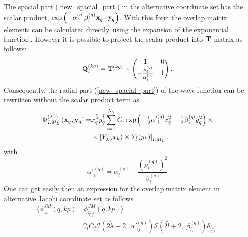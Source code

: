 \documentclass[
12pt, %
oneside, %
english, %
doublespacing, %
doublespacing, %
toctotoc, %
parskip, %
headsepline, %
]{MastersDoctoralThesis} %
\begin{document}
The spacial part (\ref{new_spacial_part}) in the alternative coordinate set has the scalar product, $\exp \left(- \alpha_i^{(q)} \beta_i^{(q)}  {\bf x}_q \cdot {\bf y}_q  \right)$. With this form the overlap matrix elements can be calculated directly, using the expansion of the exponential function \cite{suzuki1998stochastic}. However it is possible  to project the scalar product into ${\bf T}$ matrix \cite{kukulin1990dynamic} as follows:
 \begin{equation}
{\bf Q}_i^{(kq)}= {\bf T}^{(kq)} \times
\begin{pmatrix}
1 &  0 \\ 
-\tfrac{\rho^{(q)}_{i}}{\alpha^{(q)}_i} & 1
\end{pmatrix} .
\label{q_rotation_matrix}
\end{equation}
Consequently, the radial part (\ref{new_spacial_part}) of the wave function can be rewritten without the scalar product term as
\begin{align}
 \Phi_{LM_L}^{(\tilde{\lambda},\tilde{l}) } \left(  {\bf x}_q, {\bf y}_q \right)  =  &
x^{\tilde{\lambda}}_q y^{\tilde{l}}_q 
\sum_{i=1}^{N_\gamma} C_i 
\exp\left( - \tfrac{1}{2} 
{\alpha'}^{(q)}_{i}
 x^2_q -\tfrac{1}{2}  \beta_i^{(q)} y^2_q \right)
\times \nonumber \\
& \times \left[ 
Y_{\tilde{\lambda}} \left(\hat{x}_k \right) \times Y_{\tilde{l}} \left(\hat{y}_k \right)
\right]_{LM_L}.
\label{new_spacial_part}
\end{align}
with 
\begin{equation}
{\alpha'}^{(q)}_{i}=
\alpha^{(q)}_{i}-\frac{\left(\rho^{(q)}_{i}{}\right)^2}{\beta^{(q)}_{i}}
\end{equation}
One can get easily then an expression for the overlap matrix element in alternative Jacobi coordinate set as follows
\begin{align}
\langle \phi^{JM}_{\tilde{\gamma}i}\left(q,kp \right) & \vert 
\phi^{JM}_{\tilde{\gamma}^{\prime}j}\left(q,kp \right) \rangle =
 \label{matrix_element_alter_set} \\
=& 
 C_i C_j
 \mathcal{I} \left( 2 \tilde{\lambda}+2,~
\alpha'^{(q)}_{ij}
  \right)
\mathcal{I} \left( 2 \tilde{l}+2, ~
\beta_{ij}^{(q)} \right)
  \delta_{\tilde{\gamma}\tilde{\gamma}^{\prime}}. \nonumber
\end{align}
\end{document}
